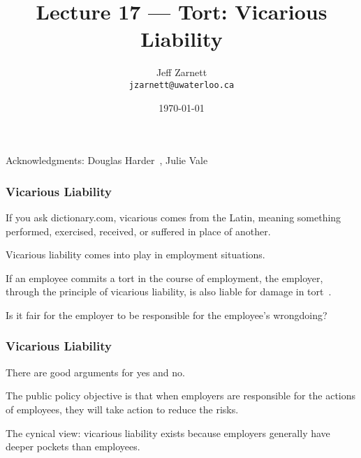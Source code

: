

\title{Lecture 17 --- Tort: Vicarious Liability }

\author{Jeff Zarnett \\ \small \texttt{jzarnett@uwaterloo.ca}}
\date{\today}




\begin{frame}
  \titlepage

\begin{center}
  \small{Acknowledgments: Douglas Harder~\cite{dwh}, Julie Vale~\cite{jv}}
  \end{center}
\end{frame}



\begin{frame}
\frametitle{Vicarious Liability}

If you ask dictionary.com, vicarious comes from the Latin, meaning something performed, exercised, received, or suffered in place of another.

Vicarious liability comes into play in employment situations.

If an employee commits a tort in the course of employment, the employer, through the principle of vicarious liability, is also liable for damage in tort~\cite{lpe}.

Is it fair for the employer to be responsible for the employee's wrongdoing?

\end{frame}



\begin{frame}
\frametitle{Vicarious Liability}

There are good arguments for yes and no.

The public policy objective is that when employers are responsible for the actions of employees, they will take action to reduce the risks.


The cynical view: vicarious liability exists because employers generally have deeper pockets than employees.

\end{frame}




